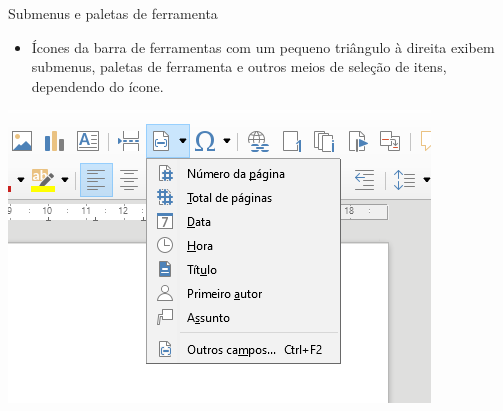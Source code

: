 \begin{frame}{Submenus e paletas de ferramenta}
	\begin{block}{}
		\begin{itemize}
			\item Ícones da barra de ferramentas com um pequeno triângulo à direita exibem submenus, paletas de ferramenta e outros meios de seleção de itens, dependendo do ícone.
		\end{itemize}
	\end{block}

	\centering
	\includegraphics[width=0.7\linewidth]{Figuras/Ch04/fig12}
\end{frame}


